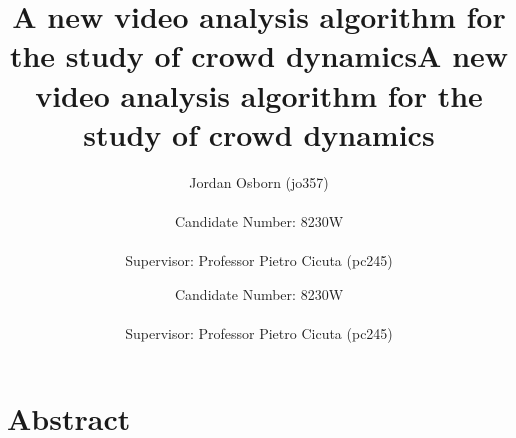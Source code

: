 \documentclass[11pt]{article}
\title{A new video analysis algorithm for the study of crowd dynamics}
\author{Jordan Osborn (jo357)
\\\\
Candidate Number: 8230W
\\\\
Supervisor: Professor Pietro Cicuta (pc245)}
\begin{document}
\begin{titlingpage}
    \maketitle
\end{titlingpage}


\clearpage
\title{A new video analysis algorithm for the study of crowd dynamics}
\author{Candidate Number: 8230W
\\\\
Supervisor: Professor Pietro Cicuta (pc245)}
\maketitle
\section*{Abstract}
\end{document}
